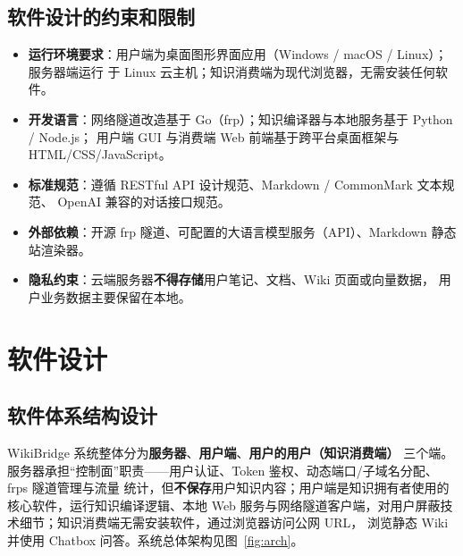 \documentclass[UTF8,a4paper,12pt]{ctexart}
\newcommand{\keypoint}[1]{\textcolor{whu}{\textbf{#1}}}
\begin{document}
\subsection{软件设计的约束和限制}
\begin{itemize}[leftmargin=2.2em]
  \item \textbf{运行环境要求}：用户端为桌面图形界面应用（Windows / macOS / Linux）；服务器端运行
        于 Linux 云主机；知识消费端为现代浏览器，无需安装任何软件。
  \item \textbf{开发语言}：网络隧道改造基于 Go（frp）；知识编译器与本地服务基于 Python / Node.js；
        用户端 GUI 与消费端 Web 前端基于跨平台桌面框架与 HTML/CSS/JavaScript。
  \item \textbf{标准规范}：遵循 RESTful API 设计规范、Markdown / CommonMark 文本规范、
        OpenAI 兼容的对话接口规范。
  \item \textbf{外部依赖}：开源 frp 隧道、可配置的大语言模型服务（API）、Markdown 静态站渲染器。
  \item \textbf{隐私约束}：云端服务器\keypoint{不得存储}用户笔记、文档、Wiki 页面或向量数据，
        用户业务数据主要保留在本地。
\end{itemize}

\section{软件设计}

\subsection{软件体系结构设计}
WikiBridge 系统整体分为\keypoint{服务器}、\keypoint{用户端}、\keypoint{用户的用户（知识消费端）}
三个端。服务器承担“控制面”职责——用户认证、Token 鉴权、动态端口/子域名分配、frps 隧道管理与流量
统计，但\keypoint{不保存}用户知识内容；用户端是知识拥有者使用的核心软件，运行知识编译逻辑、本地
Web 服务与网络隧道客户端，对用户屏蔽技术细节；知识消费端无需安装软件，通过浏览器访问公网 URL，
浏览静态 Wiki 并使用 Chatbox 问答。系统总体架构见图~\ref{fig:arch}。
\end{document}
